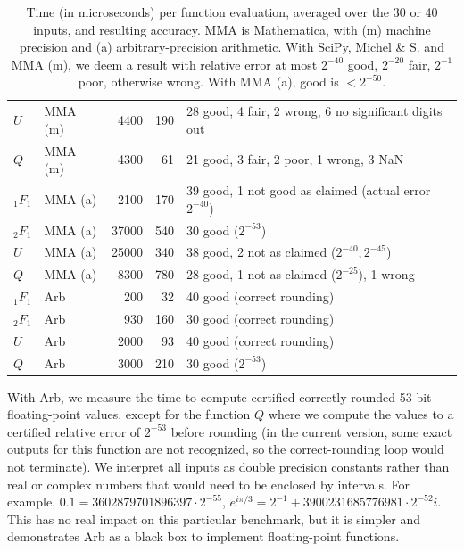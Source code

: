 \documentclass[11pt]{article}
\begin{document}
\begin{table}
\begin{center}
\begin{scriptsize}
\begin{tabular}{l l | r r | l}
$U$       & MMA (m)       & 4400      & 190   &  28 good, 4 fair, 2 wrong, 6 no significant digits out \\
$Q$       & MMA (m)       & 4300      &   61  &  21 good, 3 fair, 2 poor, 1 wrong, 3 NaN \\
\hline
${}_1F_1$ & MMA (a)       & 2100      & 170   & 39 good, 1 not good as claimed (actual error $2^{-40}$) \\
${}_2F_1$ & MMA (a)       & 37000     & 540   & 30 good ($2^{-53}$) \\
$U$       & MMA (a)       & 25000     & 340   & 38 good, 2 not as claimed ($2^{-40}, 2^{-45}$) \\
$Q$       & MMA (a)       & 8300      & 780   & 28 good, 1 not as claimed ($2^{-25}$), 1 wrong \\
\hline
${}_1F_1$ & Arb           &  200      & 32    & 40 good (correct rounding) \\
${}_2F_1$ & Arb           &  930      & 160   & 30 good (correct rounding) \\
$U$       & Arb           & 2000      & 93    & 40 good (correct rounding) \\
$Q$       & Arb           & 3000      & 210   & 30 good ($2^{-53}$) \\
\end{tabular}
\end{scriptsize}
\caption{Time (in microseconds) per function evaluation, averaged over the 30 or 40 inputs, and resulting accuracy.
MMA is Mathematica, with (m) machine precision and (a) arbitrary-precision arithmetic.
With SciPy, Michel \& S. and MMA (m), we deem a result with relative error at most $2^{-40}$ good,
$2^{-20}$ fair, $2^{-1}$ poor, otherwise wrong. With MMA (a), good is $<2^{-50}$.}
\label{tab:pearson2}
\end{center}
\end{table}

With Arb, we measure the time to compute certified correctly rounded 53-bit
floating-point values, except for the function $Q$ where we compute
the values to a certified relative error of $2^{-53}$ before
rounding (in the current version,
some exact outputs for this function are not recognized,
so the correct-rounding loop would not terminate).
We interpret all inputs as double precision constants rather than
real or complex numbers that would need to be enclosed by intervals.
For example, $0.1 = 3602879701896397 \cdot 2^{-55}$, $e^{i \pi/3} = 2^{-1} + 3900231685776981 \cdot 2^{-52} i$.
This has no real impact on this particular benchmark, but it is
simpler and demonstrates Arb as a black box to implement floating-point functions.
\end{document}
